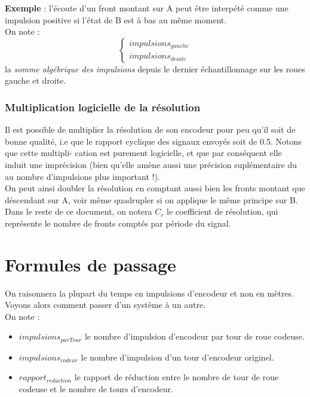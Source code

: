         \textbf{Exemple} : l’écoute d’un front montant sur A peut être interpété comme une impulsion positive si l’état de B est à bas au même moment.\\
        On note :
        $$
            \begin{cases}
                impulsions_{gauche}\\
                impulsions_{droite}
            \end{cases}
        $$
        la \textit{somme algébrique des impulsions} depuis le dernier échantillonnage sur les roues gauche et droite.

        \subsubsection{Multiplication logicielle de la résolution}
            Il est possible de multiplier la résolution de son encodeur pour peu qu’il soit de bonne qualité, i.e que le rapport cyclique des signaux envoyés soit de 0.5. Notons que cette multipli-
            cation est purement logicielle, et que par conséquent elle induit une imprécision (bien qu’elle amène aussi une précision suplémentaire du au nombre d’impulsions plus important !).\\
            On peut ainsi doubler la résolution en comptant aussi bien les fronts montant que déscendant sur A, voir même quadrupler si on applique le même principe sur B.\\
            Dans le reste de ce document, on notera $C_r$ le coefficient de résolution, qui représente le nombre de fronts comptés par période du signal.

    \newpage
    \section{Formules de passage}
        On raisonnera la plupart du temps en impulsions d’encodeur et non en mètres. Voyons alors comment passer d’un système à un autre.\\
        On note :
        \begin{itemize}
            \item $impulsions_{parTour}$ le nombre d’impulsion d’encodeur par tour de roue codeuse.
            \item $impulsions_{codeur}$ le nombre d’impulsion d’un tour d’encodeur originel.
            \item $rapport_{reduction}$ le rapport de réduction entre le nombre de tour de roue codeuse et le nombre de tours d’encodeur.\\
        \end{itemize}

